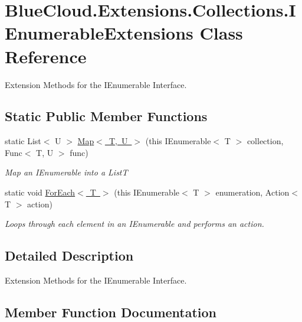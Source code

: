 \hypertarget{class_blue_cloud_1_1_extensions_1_1_collections_1_1_i_enumerable_extensions}{}\section{Blue\+Cloud.\+Extensions.\+Collections.\+I\+Enumerable\+Extensions Class Reference}
\label{class_blue_cloud_1_1_extensions_1_1_collections_1_1_i_enumerable_extensions}


Extension Methods for the I\+Enumerable Interface.  


\subsection*{Static Public Member Functions}
\begin{DoxyCompactItemize}
\item 
static List$<$ U $>$ \mbox{\hyperlink{class_blue_cloud_1_1_extensions_1_1_collections_1_1_i_enumerable_extensions_aa66be5444752af92c1b9e672f08cb73f}{Map$<$ T, U $>$}} (this I\+Enumerable$<$ T $>$ collection, Func$<$ T, U $>$ func)
\begin{DoxyCompactList}\small\item\em Map an I\+Enumerable into a List{\itshape T}  \end{DoxyCompactList}\item 
static void \mbox{\hyperlink{class_blue_cloud_1_1_extensions_1_1_collections_1_1_i_enumerable_extensions_a2c72095e8d88f897abca2112df17bb89}{For\+Each$<$ T $>$}} (this I\+Enumerable$<$ T $>$ enumeration, Action$<$ T $>$ action)
\begin{DoxyCompactList}\small\item\em Loops through each element in an I\+Enumerable and performs an action. \end{DoxyCompactList}\end{DoxyCompactItemize}


\subsection{Detailed Description}
Extension Methods for the I\+Enumerable Interface. 



\subsection{Member Function Documentation}
\mbox{\label{class_blue_cloud_1_1_extensions_1_1_collections_1_1_i_enumerable_extensions_a2c72095e8d88f897abca2112df17bb89}} 
